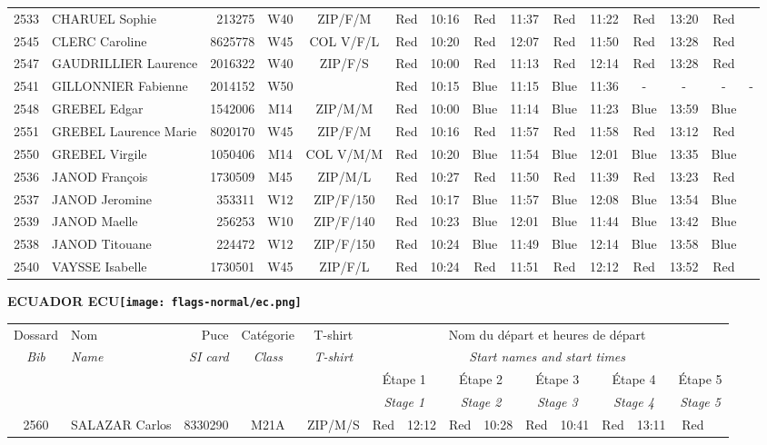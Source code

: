 \documentclass{report}
\begin{document}
\begin{longtable}{|c|l|r|c|c|*{5}{cc|}}
    2533 & CHARUEL Sophie & 213275 & W40 & ZIP/F/M & Red & 10:16 & Red & 11:37 & Red & 11:22 & Red & 13:20 & Red &  \\
    2545 & CLERC Caroline & 8625778 & W45 & COL V/F/L & Red & 10:20 & Red & 12:07 & Red & 11:50 & Red & 13:28 & Red &  \\
    2547 & GAUDRILLIER Laurence & 2016322 & W40 & ZIP/F/S & Red & 10:00 & Red & 11:13 & Red & 12:14 & Red & 13:28 & Red &  \\
    2541 & GILLONNIER Fabienne & 2014152 & W50 &   & Red & 10:15 & Blue & 11:15 & Blue & 11:36 & - &  - & - &  -\\
    2548 & GREBEL Edgar & 1542006 & M14 & ZIP/M/M & Red & 10:00 & Blue & 11:14 & Blue & 11:23 & Blue & 13:59 & Blue &  \\
    2551 & GREBEL Laurence Marie & 8020170 & W45 & ZIP/F/M & Red & 10:16 & Red & 11:57 & Red & 11:58 & Red & 13:12 & Red &  \\
    2550 & GREBEL Virgile & 1050406 & M14 & COL V/M/M & Red & 10:20 & Blue & 11:54 & Blue & 12:01 & Blue & 13:35 & Blue &  \\
    2536 & JANOD François & 1730509 & M45 & ZIP/M/L & Red & 10:27 & Red & 11:50 & Red & 11:39 & Red & 13:23 & Red &  \\
    2537 & JANOD Jeromine & 353311 & W12 & ZIP/F/150 & Red & 10:17 & Blue & 11:57 & Blue & 12:08 & Blue & 13:54 & Blue &  \\
    2539 & JANOD Maelle & 256253 & W10 & ZIP/F/140 & Red & 10:23 & Blue & 12:01 & Blue & 11:44 & Blue & 13:42 & Blue &  \\
    2538 & JANOD Titouane & 224472 & W12 & ZIP/F/150 & Red & 10:24 & Blue & 11:49 & Blue & 12:14 & Blue & 13:58 & Blue &  \\
    2540 & VAYSSE Isabelle & 1730501 & W45 & ZIP/F/L & Red & 10:24 & Red & 11:51 & Red & 12:12 & Red & 13:52 & Red &  \\
  \end{longtable}
\newpage
  \Huge \centering \bfseries ECUADOR  ECU\normalfont \footnotesize \sffamily \hfill \texttt{[image: flags-normal/ec.png]} \newline 
  \begin{longtable}{|c|l|r|c|c|*{5}{cc|}}
    Dossard & Nom  & Puce    & Catégorie & T-shirt & \multicolumn{10}{c|}{Nom du départ et heures de départ} \\
    \itshape Bib     & \itshape Name & \itshape SI card & \itshape Class  & \itshape  T-shirt  & \multicolumn{10}{c|}{\itshape Start names and start times} \\
    \hline
    & & & & & \multicolumn{2}{c|}{Étape 1} & \multicolumn{2}{c|}{Étape 2} & \multicolumn{2}{c|}{Étape 3} & \multicolumn{2}{c|}{Étape 4} & \multicolumn{2}{c|}{Étape 5} \\
    & & & & & \multicolumn{2}{c|}{\itshape Stage 1} & \multicolumn{2}{c|}{\itshape Stage 2} & \multicolumn{2}{c|}{\itshape Stage 3} & \multicolumn{2}{c|}{\itshape Stage 4} & \multicolumn{2}{c|}{\itshape Stage 5} \\
    \hline
    2560 & SALAZAR Carlos & 8330290 & M21A & ZIP/M/S & Red & 12:12 & Red & 10:28 & Red & 10:41 & Red & 13:11 & Red &  \\
  \end{longtable}
\end{document}
